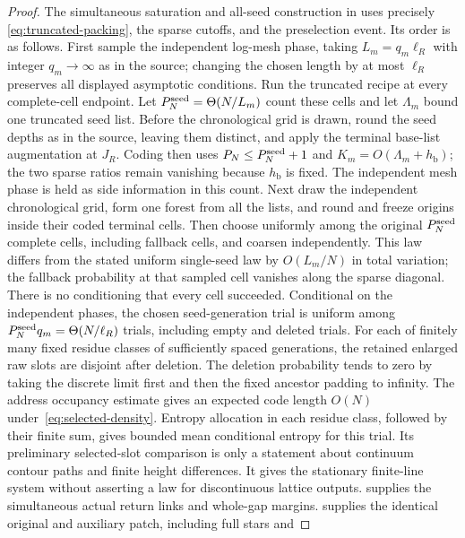 \begin{proof}
The simultaneous saturation and all-seed construction in
\cite[Section~11]{P} uses precisely
\eqref{eq:truncated-packing}, the sparse cutoffs, and the
preselection event.  Its order is as follows.  First sample the
independent log-mesh phase, taking \(L_m=q_m\ell_R\) with integer
\(q_m\to\infty\) as in the source; changing the chosen length by
at most \(\ell_R\) preserves all displayed asymptotic conditions.
Run the truncated recipe at every
complete-cell endpoint.  Let \(P_N^{\rm seed}=\Theta(N/L_m)\)
count these cells and let \(\Lambda_m\) bound one truncated seed list.
Before the chronological grid is drawn,
round the seed depths as in the source, leaving them distinct,
and apply the terminal base-list augmentation at \(J_R\).
Coding then uses \(P_N\le P_N^{\rm seed}+1\) and
\(K_m=O(\Lambda_m+h_{\mathrm b})\); the two sparse ratios remain
vanishing because \(h_{\mathrm b}\) is fixed.  The independent
mesh phase is held as side information in this count.
Next draw the independent chronological
grid, form one forest from all the lists, and round and freeze
origins inside their coded terminal cells.  Then choose uniformly
among the original \(P_N^{\rm seed}\) complete cells, including
fallback cells, and
coarsen independently.  This law differs from the stated uniform
single-seed law by \(O(L_m/N)\) in total variation; the fallback
probability at that sampled cell vanishes along the sparse diagonal.
There is no conditioning that every cell succeeded.  Conditional
on the independent phases, the chosen seed-generation trial is
uniform among
\(P_N^{\rm seed}q_m=\Theta(N/\ell_R)\)
trials, including empty and
deleted trials.  For each of finitely many fixed residue classes
of sufficiently spaced generations, the retained enlarged raw
slots are disjoint after deletion.  The deletion probability tends
to zero by taking the discrete limit first and then the fixed
ancestor padding to infinity.  The address occupancy estimate
gives an expected code length \(O(N)\) under~\eqref{eq:selected-density}.
Entropy allocation in each residue class, followed by their finite
sum, gives bounded mean conditional entropy for this trial.
Its preliminary selected-slot comparison is
only a statement about continuum contour paths and finite height
differences.  It gives the stationary finite-line system without
asserting a law for discontinuous lattice outputs.
\cite[Lemma~11.12]{P} supplies the simultaneous actual return
links and whole-gap margins.  \cite[Lemma~11.24]{P} supplies the
identical original and auxiliary patch, including full stars and

\end{proof}
